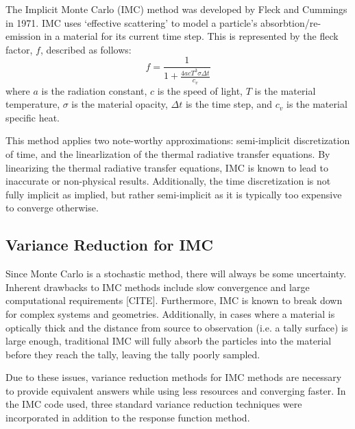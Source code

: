 \documentclass[]{article}
\begin{document}
		The Implicit Monte Carlo (IMC) method was developed by Fleck and Cummings in 1971. IMC uses `effective scattering' to model a particle's absorbtion/re-emission in a material for its current time step. This is represented by the fleck factor, $f$, described as follows:
		\begin{equation}
			f = \frac{1}{1 + \frac{4acT^{3}\sigma \Delta t}{c_{v}}}
		\end{equation}
		where $a$ is the radiation constant, $c$ is the speed of light, $T$ is the material temperature, $\sigma$ is the material opacity, $\Delta t$ is the time step, and $c_{v}$ is the material specific heat.
		
		This method applies two note-worthy approximations: semi-implicit discretization of time, and the linearlization of the thermal radiative transfer equations. By linearizing the thermal radiative transfer equations, IMC is known to lead to inaccurate or non-physical results. Additionally, the time discretization is not fully implicit as implied, but rather semi-implicit as it is typically too expensive to converge otherwise. 
			
	\subsection{Variance Reduction for IMC}
		Since Monte Carlo is a stochastic method, there will always be some uncertainty. Inherent drawbacks to IMC methods include slow convergence and large computational requirements [CITE]. Furthermore, IMC is known to break down for complex systems and geometries. Additionally, in cases where a material is optically thick and the distance from source to observation (i.e. a tally surface) is large enough, traditional IMC will fully absorb the particles into the material before they reach the tally, leaving the tally poorly sampled.
		
		Due to these issues, variance reduction methods for IMC methods are necessary to provide equivalent answers while using less resources and converging faster. In the IMC code used, three standard variance reduction techniques were incorporated in addition to the response function method. 
		
\end{document}
